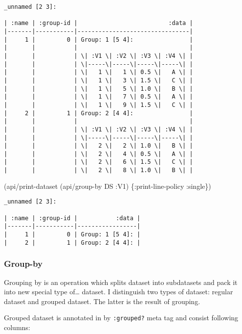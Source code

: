 \documentclass[]{article}
\newenvironment{Shaded}{\begin{snugshade}}{\end{snugshade}}
\newcommand{\AttributeTok}[1]{\textcolor[rgb]{0.77,0.63,0.00}{#1}}
\newcommand{\NormalTok}[1]{#1}
\begin{document}
\begin{verbatim}
_unnamed [2 3]:

| :name | :group-id |                          :data |
|-------|-----------|--------------------------------|
|     1 |         0 | Group: 1 [5 4]:                |
|       |           |                                |
|       |           | \| :V1 \| :V2 \| :V3 \| :V4 \| |
|       |           | \|-----\|-----\|-----\|-----\| |
|       |           | \|   1 \|   1 \| 0.5 \|   A \| |
|       |           | \|   1 \|   3 \| 1.5 \|   C \| |
|       |           | \|   1 \|   5 \| 1.0 \|   B \| |
|       |           | \|   1 \|   7 \| 0.5 \|   A \| |
|       |           | \|   1 \|   9 \| 1.5 \|   C \| |
|     2 |         1 | Group: 2 [4 4]:                |
|       |           |                                |
|       |           | \| :V1 \| :V2 \| :V3 \| :V4 \| |
|       |           | \|-----\|-----\|-----\|-----\| |
|       |           | \|   2 \|   2 \| 1.0 \|   B \| |
|       |           | \|   2 \|   4 \| 0.5 \|   A \| |
|       |           | \|   2 \|   6 \| 1.5 \|   C \| |
|       |           | \|   2 \|   8 \| 1.0 \|   B \| |
\end{verbatim}

\begin{Shaded}
\begin{Highlighting}[]
\NormalTok{(api/print-dataset (api/group-by DS }\AttributeTok{:V1}\NormalTok{) \{}\AttributeTok{:print-line-policy} \AttributeTok{:single}\NormalTok{\})}
\end{Highlighting}
\end{Shaded}

\begin{verbatim}
_unnamed [2 3]:

| :name | :group-id |           :data |
|-------|-----------|-----------------|
|     1 |         0 | Group: 1 [5 4]: |
|     2 |         1 | Group: 2 [4 4]: |
\end{verbatim}

\hypertarget{group-by}{%
\subsubsection{Group-by}\label{group-by}}

Grouping by is an operation which splits dataset into subdatasets and
pack it into new special type of\ldots{} dataset. I distinguish two
types of dataset: regular dataset and grouped dataset. The latter is the
result of grouping.

Grouped dataset is annotated in by \texttt{:grouped?} meta tag and
consist following columns:
\end{document}
